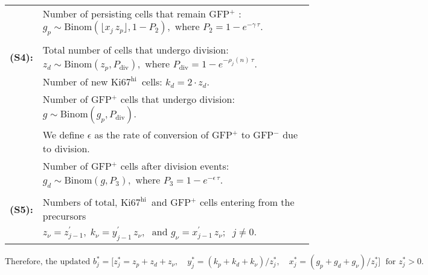 \documentclass[11pt]{article}
\newcommand{\khi}{\ensuremath{\text{Ki67}^\text{hi}}~}
\begin{document}
\begin{mybox}
\begin{tabular}{ll}
    & Number of persisting cells that remain GFP$^+$ : $g_{p} \sim \text{Binom}(\lfloor x_j  \, z_{p}\rfloor,  1-P_{2}),  \text{ where }P_2 =1 - e^{-\gamma \, \tau}.$ \\
    \\
    \textbf{(S4):}  & Total number of cells that undergo division: $z_{d} \sim \text{Binom}(z_{p} , P_\text{div}), \text{ where } P_\text{div}= 1 - e^{-\rho_{j}(n) \, \tau}.$ \\
    & Number of new \khi cells: $k_d = 2 \cdot z_{d}$. \\
    & Number of GFP$^+$ cells that undergo division: $g \sim \text{Binom}(g_{p}, P_\text{div})$. \\
    & We define $\epsilon$ as the rate of conversion of GFP$^+$ to GFP$^-$ due to division.\\
    & Number of GFP$^+$ cells after division events: $g_{d} \sim \text{Binom}(g,  P_3), \text{ where } P_3 = 1 - e^{-\epsilon \, \tau}$.\\ 
    \\
    \textbf{(S5):}  &Numbers of total, \khi and GFP$^+$ cells entering from the precursors \\
    & $z_{\nu} =  z^\prime_{j-1}, \; k_\nu = y^\prime_{j-1} \, z_\nu, \; \text{ and } g_\nu = x^\prime_{j-1}\, z_\nu;  \;\; j\neq0.$ \\ %
\end{tabular}

$$\text{Therefore, the updated } b_j^* = \big[ z_{j}^* = z_{p} + z_{d} + z_{\nu}, \quad y_j^* = (k_{p} + k_{d} + k_{\nu})/z_{j}^*, \quad x_j^* = (g_{p} + g_{d} + g_{\nu})/z_{j}^* \big]\; \text{ for } z_{j}^*>0. $$

\end{mybox}
\end{document}
